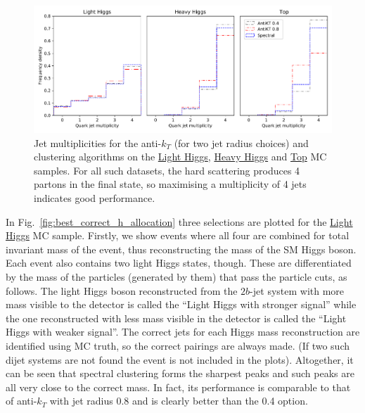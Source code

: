 \begin{figure}[htp]
    \begin{center}
        \includegraphics[width=1.0\textwidth]{graphics/multiplicity/multiplicity2}
    \end{center}
    \caption{Jet multiplicities for the anti-$k_T$ (for two jet radius choices) and \spectral{} clustering algorithms on the \underline{Light Higgs}, \underline{Heavy Higgs} and \underline{Top} MC 
 samples. For all such datasets, the hard scattering produces  4 partons in the final  state, so maximising a multiplicity of 4 jets indicates good performance.   
    }\label{fig:multiplicity}
\end{figure}    




In Fig.~\ref{fig:best_correct_h_allocation} three selections are plotted for the \underline{Light Higgs} MC sample. Firstly, we show events where all four 
are combined for total invariant mass of the event, thus reconstructing the mass of the SM Higgs boson.
Each event also contains two light Higgs states, though. These are differentiated by the mass of the particles (generated by them) that pass the particle cuts,
as follows. The light Higgs boson reconstructed from the $2b$-jet system with more mass visible to the detector is called the ``Light Higgs with stronger signal''
while the one reconstructed  with less mass visible in the detector is called the ``Light Higgs with weaker signal''.
The correct jets for each Higgs mass reconstruction are identified using MC truth,
so the correct pairings are always made. (If two such dijet systems are not found the event is not included in the plots).
Altogether, it can be seen that spectral clustering forms the sharpest peaks and such peaks are all very close to the correct mass. In fact, its performance
is comparable to that of anti-$k_T$ with jet radius 0.8 and is clearly better than the 0.4 option. 


